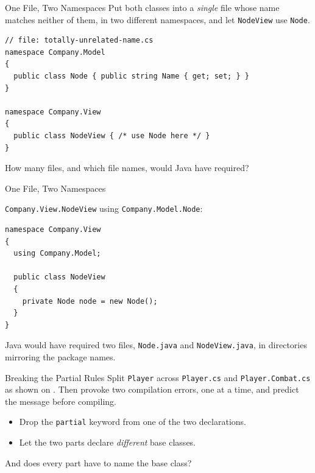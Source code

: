 \begin{exerciseframe}{One File, Two Namespaces}
  Put both classes into a \emph{single} file whose name matches neither of them,
  in two different namespaces, and let \texttt{NodeView} use \texttt{Node}.
  \vspace{1ex}

  \begin{lstlisting}[basicstyle=\scriptsize\ttfamily]
// file: totally-unrelated-name.cs
namespace Company.Model
{
  public class Node { public string Name { get; set; } }
}

namespace Company.View
{
  public class NodeView { /* use Node here */ }
}
  \end{lstlisting}
  \vspace{1ex}

  How many files, and which file names, would Java have required?
\end{exerciseframe}

\begin{solutionframe}{One File, Two Namespaces}

  \texttt{Company.View.NodeView} using  \texttt{Company.Model.Node}:

  \begin{lstlisting}[basicstyle=\scriptsize\ttfamily]
namespace Company.View
{
  using Company.Model;

  public class NodeView
  {
    private Node node = new Node();
  }
}
  \end{lstlisting}
  Java would have required two files, \texttt{Node.java} and
  \texttt{NodeView.java}, in directories mirroring the package names.
  \vspace{2ex}

\end{solutionframe}

\begin{exerciseframe}{Breaking the Partial Rules}
  Split \texttt{Player} across \texttt{Player.cs} and
  \texttt{Player.Combat.cs} as shown on . Then provoke
  two compilation errors, one at a
  time, and predict the message before compiling.
  \vspace{1ex}

  \begin{itemize}
    \item Drop the \texttt{partial} keyword from one of the two declarations.
    \item Let the two parts declare \emph{different} base classes.
  \end{itemize}
  \vspace{1ex}

  And does every part have to name the base class?
\end{exerciseframe}


